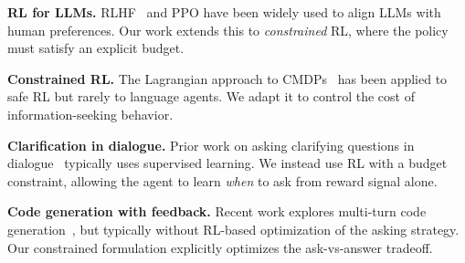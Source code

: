 \documentclass[11pt]{article}
\begin{document}
\textbf{RL for LLMs.} RLHF~\citep{ouyang2022training} and PPO have been widely used to align LLMs with human preferences. Our work extends this to \emph{constrained} RL, where the policy must satisfy an explicit budget.

\textbf{Constrained RL.} The Lagrangian approach to CMDPs~\citep{altman1999constrained, tessler2018reward} has been applied to safe RL but rarely to language agents. We adapt it to control the cost of information-seeking behavior.

\textbf{Clarification in dialogue.} Prior work on asking clarifying questions in dialogue~\citep{rao2018learning, aliannejadi2019asking} typically uses supervised learning. We instead use RL with a budget constraint, allowing the agent to learn \emph{when} to ask from reward signal alone.

\textbf{Code generation with feedback.} Recent work explores multi-turn code generation~\citep{zheng2024humanevalcomm}, but typically without RL-based optimization of the asking strategy. Our constrained formulation explicitly optimizes the ask-vs-answer tradeoff.
\end{document}
